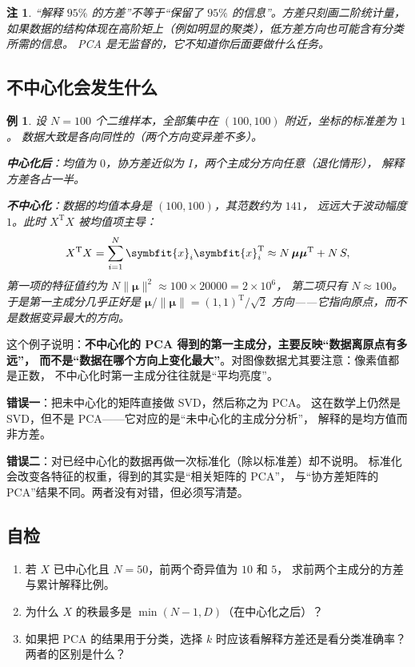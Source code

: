 \documentclass[UTF8, 11pt, a4paper, fontset=windows]{ctexart}
\theoremstyle{cnthm}
\theoremstyle{cndef}
\newtheorem{exam}[defn]{例}
\newtheorem{rem}[defn]{注}
\newcommand{\T}{^{\mathrm{T}}}
\newcommand{\nrm}[1]{\lVert #1 \rVert}
\newcommand{\x}{\symbfit{x}}
\begin{document}
\begin{rem}
“解释 $95\%$ 的方差”不等于“保留了 $95\%$ 的信息”。方差只刻画二阶统计量，
如果数据的结构体现在高阶矩上（例如明显的聚类），低方差方向也可能含有分类所需的信息。
PCA 是无监督的，它不知道你后面要做什么任务。
\end{rem}

\subsection{不中心化会发生什么}\label{sec:no-center}

\begin{exam}\label{exam:no-center}
设 $N=100$ 个二维样本，全部集中在 $(100,100)$ 附近，坐标的标准差为 $1$。
数据大致是各向同性的（两个方向变异差不多）。

\textbf{中心化后}：均值为 $0$，协方差近似为 $I$，两个主成分方向任意（退化情形），
解释方差各占一半。

\textbf{不中心化}：数据的均值本身是 $(100,100)$，其范数约为 $141$，
远远大于波动幅度 $1$。此时 $X\T X$ 被均值项主导：
\begin{equation}
  X\T X=\sum_{i=1}^{N}\x_i\x_i\T\approx N\,\boldsymbol{\mu}\boldsymbol{\mu}\T+N\,S ,
\end{equation}
第一项的特征值约为 $N\nrm{\boldsymbol{\mu}}^2\approx100\times20000=2\times10^{6}$，
第二项只有 $N\approx100$。于是第一主成分几乎正好是 $\boldsymbol{\mu}/\nrm{\boldsymbol{\mu}}
=(1,1)\T/\sqrt2$ 方向——它指向原点，而不是数据变异最大的方向。
\end{exam}

这个例子说明：\textbf{不中心化的 PCA 得到的第一主成分，主要反映“数据离原点有多远”，
而不是“数据在哪个方向上变化最大”}。对图像数据尤其要注意：像素值都是正数，
不中心化时第一主成分往往就是“平均亮度”。

\begin{warnbox}[两个常见错误]
\textbf{错误一}：把未中心化的矩阵直接做 SVD，然后称之为 PCA。
这在数学上仍然是 SVD，但不是 PCA——它对应的是“未中心化的主成分分析”，
解释的是均方值而非方差。

\textbf{错误二}：对已经中心化的数据再做一次标准化（除以标准差）却不说明。
标准化会改变各特征的权重，得到的其实是“相关矩阵的 PCA”，
与“协方差矩阵的 PCA”结果不同。两者没有对错，但必须写清楚。
\end{warnbox}

\subsection*{自检}
\begin{enumerate}
  \item 若 $X$ 已中心化且 $N=50$，前两个奇异值为 $10$ 和 $5$，
        求前两个主成分的方差与累计解释比例。
  \item 为什么 $X$ 的秩最多是 $\min(N-1,D)$（在中心化之后）？
  \item 如果把 PCA 的结果用于分类，选择 $k$ 时应该看解释方差还是看分类准确率？
        两者的区别是什么？
\end{enumerate}
\end{document}
